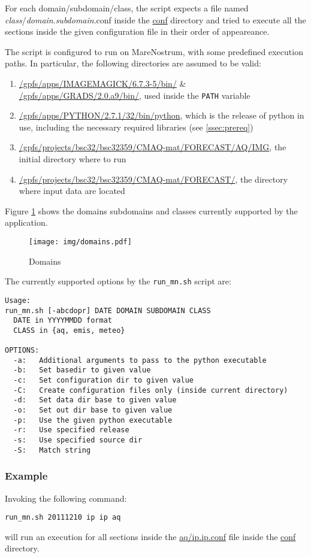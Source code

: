 \documentclass[11pt]{article}
\newcommand{\mn}{MareNostrum}
\begin{document}
For each domain/subdomain/class, the script expects a file named \textit{class}/\textit{domain}.\textit{subdomain}.conf inside the \url{conf} directory and tried to execute all the sections inside the given configuration file in their order of appeareance. 

The script is configured to run on \mn{}, with some predefined execution paths. 
In particular, the following directories are assumed to be valid: 
\begin{enumerate}
\item \url{/gpfs/apps/IMAGEMAGICK/6.7.3-5/bin/} \& \url{/gpfs/apps/GRADS/2.0.a9/bin/}, used inside the \texttt{PATH} variable 
\item \url{/gpfs/apps/PYTHON/2.7.1/32/bin/python}, which is the release of python in use, including the necessary required libraries (see \ref{ssec:prereq})
\item \url{/gpfs/projects/bsc32/bsc32359/CMAQ-mat/FORECAST/AQ/IMG}, the initial directory where to run 
\item \url{/gpfs/projects/bsc32/bsc32359/CMAQ-mat/FORECAST/}, the directory where input data are located 
\end{enumerate}

Figure \ref{fig:domains} shows the domains subdomains and classes currently supported by the application. 

\begin{figure}[H]
\begin{center}
\texttt{[image: img/domains.pdf]}
\end{center}
\caption{Domains}
\label{fig:domains}
\end{figure}

The currently supported options by the \texttt{run\_mn.sh} script are: 
\begin{verbatim}
Usage: 
run_mn.sh [-abcdopr] DATE DOMAIN SUBDOMAIN CLASS
  DATE in YYYYMMDD format
  CLASS in {aq, emis, meteo}

OPTIONS:
  -a:	Additional arguments to pass to the python executable
  -b:	Set basedir to given value
  -c:	Set configuration dir to given value
  -C:	Create configuration files only (inside current directory)
  -d:	Set data dir base to given value
  -o:	Set out dir base to given value
  -p:	Use the given python executable
  -r:	Use specified release
  -s:	Use specified source dir
  -S:	Match string
\end{verbatim}

\subsubsection{Example}
Invoking the following command:
\begin{verbatim}
run_mn.sh 20111210 ip ip aq
\end{verbatim}
will run an execution for all sections inside the \url{aq/ip.ip.conf} file inside the \url{conf} directory. 
\end{document}
